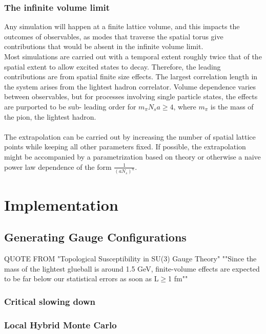 \documentclass[a4paper,10pt]{article}
\begin{document}
\subsubsection{The infinite volume limit}
Any simulation will happen at a finite lattice volume, and this impacts the outcomes of observables, as modes that traverse the spatial torus give contributions that would be absent in the infinite volume limit.\\Most simulations are carried out with a temporal extent roughly twice that of the spatial extent to allow excited states to decay. Therefore, the leading contributions are from spatial finite size effects. The largest correlation length in the system arises from the lightest hadron correlator. Volume dependence varies between observables, but for processes involving single particle states, the effects are purported to be sub- leading order for $m_\pi N_sa \geq 4$, where $m_\pi$ is the mass of the pion, the lightest hadron.\\\\The extrapolation can be carried out by increasing the number of spatial lattice points while keeping all other parameters fixed. If possible, the extrapolation might be accompanied by a parametrization based on theory or otherwise a naive power law dependence of the form $\frac{1}{(aN_s)^n}$.

\section{Implementation}
\subsection{Generating Gauge Configurations}
QUOTE FROM "Topological Susceptibility in SU(3) Gauge Theory"
""Since the mass of the
lightest glueball is around 1.5 GeV, finite-volume effects
are expected to be far below our statistical errors as soon as
L$\geq$1 fm""



\subsubsection{Critical slowing down}

\subsubsection{Local Hybrid Monte Carlo}
\end{document}

